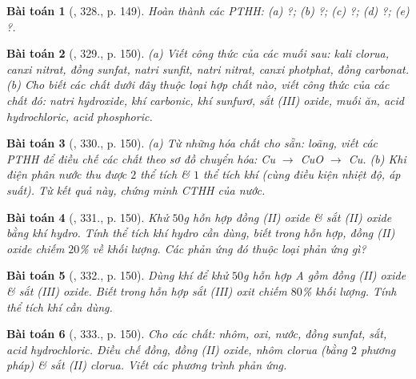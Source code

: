 \documentclass{article}
\newtheorem{baitoan}{Bài toán}
\begin{document}
\begin{baitoan}[\cite{An_400_BT_Hoa_Hoc_8_2020}, 328., p. 149]
	Hoàn thành các PTHH: (a) \emph{} ?; (b) \emph{} ?; (c) \emph{} ?; (d) \emph{} ?; (e) \emph{} ?.
\end{baitoan}

\begin{baitoan}[\cite{An_400_BT_Hoa_Hoc_8_2020}, 329., p. 150]
	(a) Viết công thức của các muối sau: kali clorua, canxi nitrat, đồng sunfat, natri sunfit, natri nitrat, canxi photphat, đồng carbonat. (b) Cho biết các chất dưới đây thuộc loại hợp chất nào, viết công thức của các chất đó: natri hydroxide, khí carbonic, khí sunfurơ, sắt (III) oxide, muối ăn, acid hydrochloric, acid phosphoric.
\end{baitoan}

\begin{baitoan}[\cite{An_400_BT_Hoa_Hoc_8_2020}, 330., p. 150]
	(a) Từ những hóa chất cho sẵn: \emph{} loãng, viết các PTHH để điều chế các chất theo sơ đồ chuyển hóa: \emph{Cu $\to$ CuO $\to$ Cu}. (b) Khi điện phân nước thu được $2$ thể tích \emph{} \& $1$ thể tích khí \emph{} (cùng điều kiện nhiệt độ, áp suất). Từ kết quả này, chứng minh CTHH của nước.
\end{baitoan}

\begin{baitoan}[\cite{An_400_BT_Hoa_Hoc_8_2020}, 331., p. 150]
	Khử $50$\emph{g} hỗn hợp đồng (II) oxide \& sắt (II) oxide bằng khí hydro. Tính thể tích khí hydro cần dùng, biết trong hỗn hợp, đồng (II) oxide chiếm $20$\% về khối lượng. Các phản ứng đó thuộc loại phản ứng gì?
\end{baitoan}

\begin{baitoan}[\cite{An_400_BT_Hoa_Hoc_8_2020}, 332., p. 150]
	Dùng khí \emph{} để khử $50$\emph{g} hỗn hợp A gồm đồng (II) oxide \& sắt (III) oxide. Biết trong hỗn hợp sắt (III) oxit chiếm $80$\% khối lượng. Tính thể tích khí \emph{} cần dùng.
\end{baitoan}

\begin{baitoan}[\cite{An_400_BT_Hoa_Hoc_8_2020}, 333., p. 150]
	Cho các chất: nhôm, oxi, nước, đồng sunfat, sắt, acid hydrochloric. Điều chế đồng, đồng (II) oxide, nhôm clorua (bằng $2$ phương pháp) \& sắt (II) clorua. Viết các phương trình phản ứng.
\end{baitoan}
\end{document}
